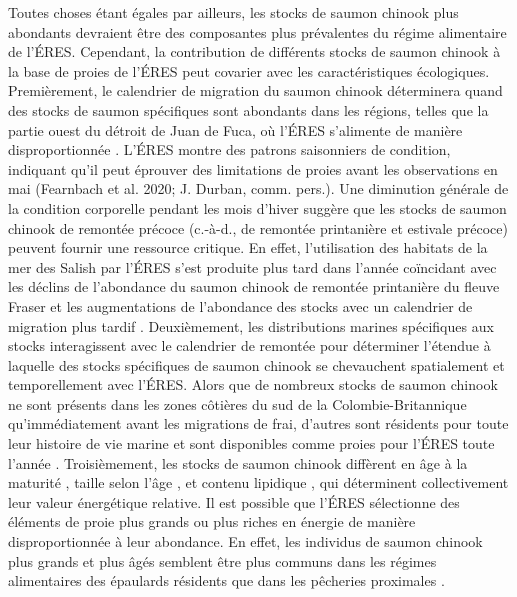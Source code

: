 Toutes choses étant égales par ailleurs, les stocks de saumon chinook plus abondants devraient être des composantes plus prévalentes du régime alimentaire de l'ÉRES. Cependant, la contribution de différents stocks de saumon chinook à la base de proies de l'ÉRES peut covarier avec les caractéristiques écologiques. Premièrement, le calendrier de migration du saumon chinook déterminera quand des stocks de saumon spécifiques sont abondants dans les régions, telles que la partie ouest du détroit de Juan de Fuca, où l'ÉRES s'alimente de manière disproportionnée \citep{thorntonSouthernResidentKiller2022}. L'ÉRES montre des patrons saisonniers de condition, indiquant qu'il peut éprouver des limitations de proies avant les observations en mai (Fearnbach et al. 2020; J. Durban, comm. pers.). Une diminution générale de la condition corporelle pendant les mois d'hiver suggère que les stocks de saumon chinook de remontée précoce (c.-à-d., de remontée printanière et estivale précoce) peuvent fournir une ressource critique. En effet, l'utilisation des habitats de la mer des Salish par l'ÉRES s'est produite plus tard dans l'année coïncidant avec les déclins de l'abondance du saumon chinook de remontée printanière du fleuve Fraser et les augmentations de l'abondance des stocks avec un calendrier de migration plus tardif \citep{ettingerShiftingPhenologyEndangered2022}. Deuxièmement, les distributions marines spécifiques aux stocks interagissent avec le calendrier de remontée pour déterminer l'étendue à laquelle des stocks spécifiques de saumon chinook se chevauchent spatialement et temporellement avec l'ÉRES. Alors que de nombreux stocks de saumon chinook ne sont présents dans les zones côtières du sud de la Colombie-Britannique qu'immédiatement avant les migrations de frai, d'autres sont résidents pour toute leur histoire de vie marine et sont disponibles comme proies pour l'ÉRES toute l'année \citep{oneillMarineDistributionLife2009, chamberlinEffectsNatalOrigin2014, freshwaterIntegratedModelSeasonal2021}. Troisièmement, les stocks de saumon chinook diffèrent en âge à la maturité \citep{healeyLifeHistoryChinook1991, ohlbergerDemographicChangesChinook2018}, taille selon l'âge \citep{ohlbergerDemographicChangesChinook2018, xuClimateEffectsSize2020}, et contenu lipidique \citep{oneillEnergyContentPacific2014, lernerSeasonalVariationLipid2023, freshwaterSeasonalVariabilityCondition2024}, qui déterminent collectivement leur valeur énergétique relative. Il est possible que l'ÉRES sélectionne des éléments de proie plus grands ou plus riches en énergie de manière disproportionnée à leur abondance. En effet, les individus de saumon chinook plus grands et plus âgés semblent être plus communs dans les régimes alimentaires des épaulards résidents que dans les pêcheries proximales \citep{fordSelectiveForagingFisheating2006}.

